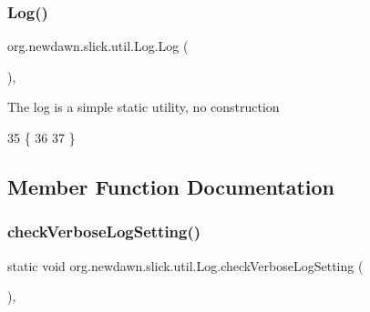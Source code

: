 \subsubsection{\texorpdfstring{Log()}{Log()}}
{\footnotesize\ttfamily org.\+newdawn.\+slick.\+util.\+Log.\+Log (\begin{DoxyParamCaption}{ }\end{DoxyParamCaption})\hspace{0.3cm}{\ttfamily [inline]}, {\ttfamily [private]}}

The log is a simple static utility, no construction 
\begin{DoxyCode}
35                   \{
36         
37     \}
\end{DoxyCode}


\subsection{Member Function Documentation}
\mbox{\label{classorg_1_1newdawn_1_1slick_1_1util_1_1_log_aeb42cb2c3abf9a72353199c7dabe3b78}} 
\subsubsection{\texorpdfstring{check\+Verbose\+Log\+Setting()}{checkVerboseLogSetting()}}
{\footnotesize\ttfamily static void org.\+newdawn.\+slick.\+util.\+Log.\+check\+Verbose\+Log\+Setting (\begin{DoxyParamCaption}{ }\end{DoxyParamCaption})\hspace{0.3cm}{\ttfamily [inline]}, {\ttfamily [static]}}

